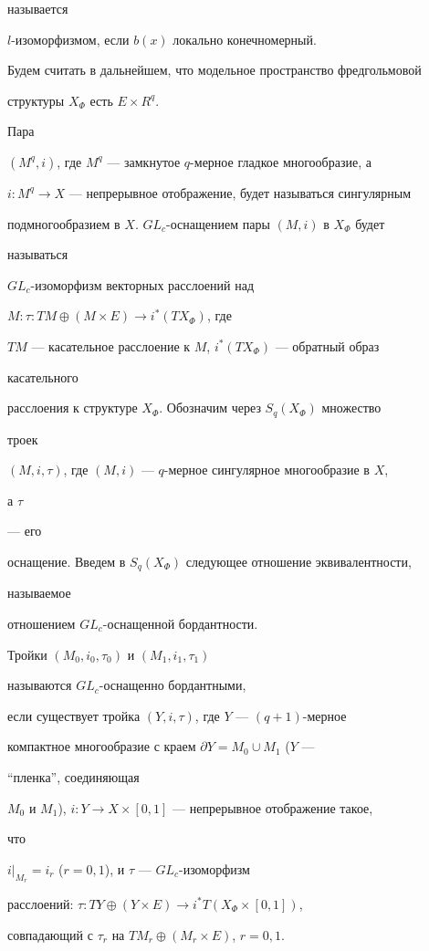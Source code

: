 называется 


$l$-изоморфизмом, если $b(x)$ локально конечномерный. 


 


Будем считать в дальнейшем, что модельное пространство фредгольмовой 


структуры $X_\Phi$ есть $E\times R^q$. 


 


Пара 


$(M^q,i)$, где $M^q$ --- замкнутое $q$-мерное гладкое многообразие, а 


$i:M^q\to X$ --- непрерывное отображение, будет называться сингулярным 


подмногообразием в $X$. $GL_c$-оснащением пары $(M,i)$ в $X_\Phi$ будет 


называться 


$GL_c$-изоморфизм векторных расслоений над 


$M:\tau:TM\oplus(M\times E)\to i^*(TX_\Phi)$, где 


$TM$ --- касательное расслоение к $M$, $i^*(TX_\Phi)$ --- обратный образ 


касательного 


расслоения к структуре $X_\Phi$. Обозначим через $S_q(X_\Phi)$ множество 


троек 


$(M,i,\tau)$, где $(M,i)$ --- $q$-мерное сингулярное многообразие в $X$, 


а $\tau$ 


--- его 


оснащение. Введем в $S_q(X_\Phi)$ следующее отношение эквивалентности, 


называемое 


отношением $GL_c$-оснащенной бордантности. 


 


\begin{defnnonum} Тройки $(M_0,i_0,\tau_0)$ и $(M_1,i_1,\tau_1)$ 


называются $GL_c$-оснащенно бордантными, 


если существует тройка $(Y,i,\tau)$, где $Y$ --- $(q+1)$-мерное 


компактное многообразие с краем $\partial Y=M_0\cup M_1$ ($Y$ --- 


``пленка'', соединяющая 


$M_0$ и $M_1$), $i:Y\to X\times[0,1]$ --- непрерывное отображение такое, 


что 


$\left. i\right|_{M_r}=i_r$ ($r=0,1$), и $\tau$ --- $GL_c$-изоморфизм 


расслоений: $\tau:TY\oplus(Y\times E)\to i^*T(X_\Phi\times[0,1])$, 


совпадающий с $\tau_r$ на $TM_r\oplus(M_r\times E)$, $r=0,1$. 


\end{defnnonum} 


